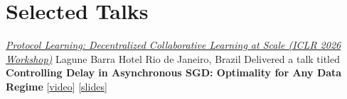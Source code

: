 \documentclass[10pt,a4paper,sans]{moderncv}        %
\newcommand{\kaust}{KAUST}
\newcommand{\thuwal}{Thuwal, Saudi Arabia}
\begin{document}


\vspace{-1em}
\section{Selected Talks}

    {\textcolor{accent}{\href{https://luma.com/q3pji65z?tk=YCVUBL}{\textit{Protocol Learning: Decentralized Collaborative Learning at Scale (ICLR 2026 Workshop)}}}}
    {Lagune Barra Hotel}
    {Rio de Janeiro, Brazil}
    {}{
      Delivered a talk titled \textbf{Controlling Delay in Asynchronous SGD: Optimality for Any Data Regime}
      [{\textcolor{orange}{\href{https://www.youtube.com/watch?v=gdR0agmkEtY}{video}}}]
      [{\href{https://artomaranjyan.github.io/assets/pdf/slides/ICLR2026_Workshop.pdf}{slides}}]
    }


\end{document}
